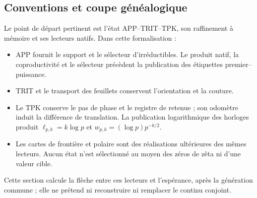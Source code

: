 \subsection{Conventions et coupe généalogique}
\label{viii:gamma-add-sub-32}

Le point de départ pertinent est l'état APP--TRIT--TPK, son raffinement à mémoire et ses lecteurs natifs. Dans cette formalisation :

\begin{itemize}
\item APP fournit le support et le sélecteur d'irréductibles. Le produit natif, la coproductivité et le sélecteur précèdent la publication des étiquettes premier--puissance.
\item TRIT et le transport des feuillets conservent l'orientation et la couture.
\item Le TPK conserve le pas de phase et le registre de retenue ; son odomètre induit la différence de translation. La publication logarithmique des horloges produit \(\ell_{p,k}=k\log p\) et \(w_{p,k}=(\log p)p^{-k/2}\).
\item Les cartes de frontière et polaire sont des réalisations ultérieures des mêmes lecteurs. Aucun état n'est sélectionné au moyen des zéros de zêta ni d'une valeur cible.

\end{itemize}
Cette section calcule la flèche entre ces lecteurs et l'espérance, après la génération commune ; elle ne prétend ni reconstruire ni remplacer le continu conjoint.

